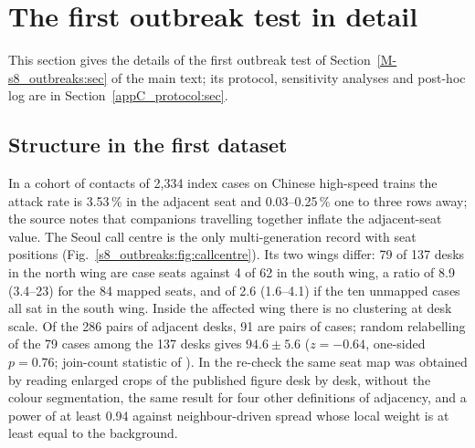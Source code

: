 \section{The first outbreak test in detail}\label{appS_first:sec}

This section gives the details of the first outbreak test of Section~\ref{M-s8_outbreaks:sec} of the main text; its
protocol, sensitivity analyses and post-hoc log are in Section~\ref{appC_protocol:sec}.

\subsection{Structure in the first dataset}

In a cohort of contacts of 2{,}334 index cases on Chinese high-speed trains \citep{hu2021} the attack rate is
3.53\,\% in the adjacent seat and 0.03--0.25\,\% one to three rows away; the source notes that companions
travelling together inflate the adjacent-seat value.
The Seoul call centre is the only multi-generation record with seat positions
(Fig.~\ref{s8_outbreaks:fig:callcentre}). Its two wings differ: 79 of 137 desks in the north wing are case
seats against 4 of 62 in the south wing, a ratio of 8.9 (3.4--23) for the 84 mapped seats, and of 2.6
(1.6--4.1) if the ten unmapped cases all sat in the south wing.
Inside the affected wing there is no clustering at desk scale. Of the 286 pairs of adjacent desks, 91 are pairs
of cases; random relabelling of the 79 cases among the 137 desks gives $94.6\pm5.6$ ($z=-0.64$, one-sided
$p=0.76$; join-count statistic of \citet{moran1948interpretation}). In the re-check the same
seat map was obtained by reading enlarged crops of the published figure desk by desk, without the colour
segmentation, the same result for four other definitions of adjacency, and a power of at least 0.94 against
neighbour-driven spread whose local weight is at least equal to the background.

